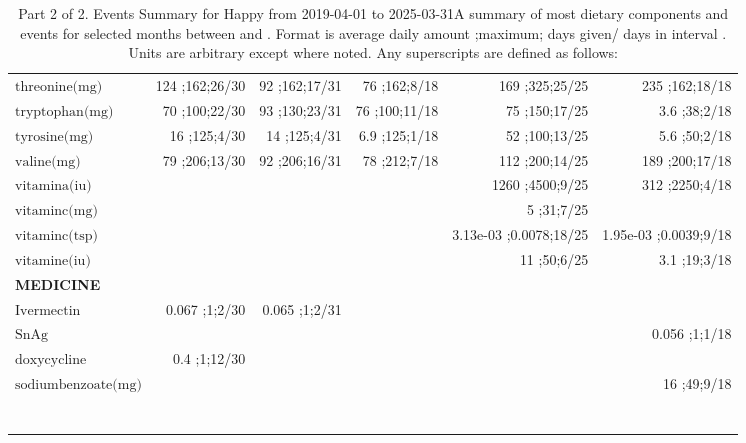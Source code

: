 \begin{table}[H]
\begin{tabular}{|l|r|r|r|r|r|}
$\textrm{threonine(mg)}$&124 ;162;26/30&92 ;162;17/31&76 ;162;8/18&169 ;325;25/25&235 ;162;18/18\\
$\textrm{tryptophan(mg)}$&70 ;100;22/30&93 ;130;23/31&76 ;100;11/18&75 ;150;17/25&3.6 ;38;2/18\\
$\textrm{tyrosine(mg)}$&16 ;125;4/30&14 ;125;4/31&6.9 ;125;1/18&52 ;100;13/25&5.6 ;50;2/18\\
$\textrm{valine(mg)}$&79 ;206;13/30&92 ;206;16/31&78 ;212;7/18&112 ;200;14/25&189 ;200;17/18\\
$\textrm{vitamina(iu)}$&&&&1260 ;4500;9/25&312 ;2250;4/18\\
$\textrm{vitaminc(mg)}$&&&&5 ;31;7/25&\\
$\textrm{vitaminc(tsp)}$&&&&3.13e-03 ;0.0078;18/25&1.95e-03 ;0.0039;9/18\\
$\textrm{vitamine(iu)}$&&&&11 ;50;6/25&3.1 ;19;3/18\\
{\bf MEDICINE}&&&&&\\
$\textrm{Ivermectin}$&0.067 ;1;2/30&0.065 ;1;2/31&&&\\
$\textrm{SnAg}$&&&&&0.056 ;1;1/18\\
$\textrm{doxycycline}$&0.4 ;1;12/30&&&&\\
$\textrm{sodiumbenzoate(mg)}$&&&&&16 ;49;9/18\\
&&&&&\\
&&&&&\\
&&&&&\\
&&&&&\\
&&&&&\\
&&&&&\\
&&&&&\\
\hline
\end{tabular}
\caption{Part 2 of 2.  Events Summary for Happy   from 2019-04-01 to 2025-03-31A summary of most dietary components and events  for selected months between \mjmdatemin and \mjmdatemax. Format is average daily amount ;maximum; days given/ days in interval . Units are arbitrary except where noted. Any  superscripts are defined as follows:  \mjmsuperscripts}
\end{table}
